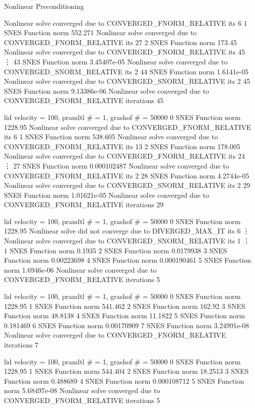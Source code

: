 \begin{frame}[fragile]{Nonlinear Preconditioning}
\begin{overprint}
\begin{semiverbatim}
    Nonlinear solve converged due to CONVERGED_FNORM_RELATIVE its 6
  1 SNES Function norm 552.271 
    Nonlinear solve converged due to CONVERGED_FNORM_RELATIVE its 27
  2 SNES Function norm 173.45 
    Nonlinear solve converged due to CONVERGED_FNORM_RELATIVE its 45
  \vdots
 43 SNES Function norm 3.45407e-05 
    Nonlinear solve converged due to CONVERGED_SNORM_RELATIVE its 2
 44 SNES Function norm 1.6141e-05 
    Nonlinear solve converged due to CONVERGED_SNORM_RELATIVE its 2
 45 SNES Function norm 9.13386e-06 
Nonlinear solve converged due to CONVERGED_FNORM_RELATIVE iterations 45
\end{semiverbatim}
\begin{semiverbatim}
lid velocity = 100, prandtl \# = 1, grashof \# = 50000
  0 SNES Function norm 1228.95 
    Nonlinear solve converged due to CONVERGED_FNORM_RELATIVE its 6
  1 SNES Function norm 538.605 
    Nonlinear solve converged due to CONVERGED_FNORM_RELATIVE its 13
  2 SNES Function norm 178.005 
    Nonlinear solve converged due to CONVERGED_FNORM_RELATIVE its 24
  \vdots
 27 SNES Function norm 0.000102487 
    Nonlinear solve converged due to CONVERGED_FNORM_RELATIVE its 2
 28 SNES Function norm 4.2744e-05 
    Nonlinear solve converged due to CONVERGED_SNORM_RELATIVE its 2
 29 SNES Function norm 1.01621e-05 
Nonlinear solve converged due to CONVERGED_FNORM_RELATIVE iterations 29
\end{semiverbatim}
\begin{semiverbatim}
lid velocity = 100, prandtl \# = 1, grashof \# = 50000
  0 SNES Function norm 1228.95 
    Nonlinear solve did not converge due to DIVERGED_MAX_IT its 6
    \vdots
        Nonlinear solve converged due to CONVERGED_SNORM_RELATIVE its 1
    \vdots
  1 SNES Function norm 0.1935 
  2 SNES Function norm 0.0179938 
  3 SNES Function norm 0.00223698 
  4 SNES Function norm 0.000190461 
  5 SNES Function norm 1.6946e-06 
Nonlinear solve converged due to CONVERGED_FNORM_RELATIVE iterations 5
\end{semiverbatim}
\begin{semiverbatim}
lid velocity = 100, prandtl \# = 1, grashof \# = 50000
  0 SNES Function norm 1228.95
  1 SNES Function norm 541.462
  2 SNES Function norm 162.92
  3 SNES Function norm 48.8138
  4 SNES Function norm 11.1822
  5 SNES Function norm 0.181469
  6 SNES Function norm 0.00170909
  7 SNES Function norm 3.24991e-08
Nonlinear solve converged due to CONVERGED_FNORM_RELATIVE iterations 7
\end{semiverbatim}
\begin{semiverbatim}
lid velocity = 100, prandtl \# = 1, grashof \# = 50000
  0 SNES Function norm 1228.95
  1 SNES Function norm 544.404
  2 SNES Function norm 18.2513
  3 SNES Function norm 0.488689
  4 SNES Function norm 0.000108712
  5 SNES Function norm 5.68497e-08
Nonlinear solve converged due to CONVERGED_FNORM_RELATIVE iterations 5
\end{semiverbatim}
\end{overprint}
\end{frame}
